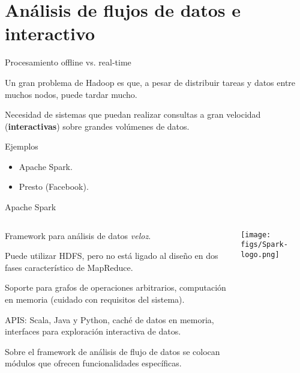 \section{Análisis de flujos de datos e interactivo}

\begin{frame}{Procesamiento offline vs. real-time}
 \begin{wideitemize}
  \item Un gran problema de Hadoop es que, a pesar de distribuir tareas y datos
  entre muchos nodos, puede tardar mucho.
  \item Necesidad de sistemas que puedan realizar consultas a gran velocidad
  (\textbf{interactivas}) sobre grandes volúmenes de datos.
  \item Ejemplos
  \begin{itemize}
   \item Apache Spark.
   \item Presto (Facebook).
  \end{itemize}

 \end{wideitemize}

\end{frame}


\begin{frame}{Apache Spark}
 \begin{columns}[T]
    \begin{column}{.8\textwidth}
     \begin{wideitemize}
      \item Framework para análisis de datos \textit{veloz}.
      \item Puede utilizar HDFS, pero no está ligado al diseño en dos fases 
      característico de MapReduce.
      \item Soporte para grafos de operaciones arbitrarios, computación en memoria
      (cuidado con requisitos del sistema).
      \item APIS: Scala, Java y Python, caché de datos en memoria, interfaces 
      para exploración interactiva de datos.
      \item Sobre el framework de análisis de flujo de datos se colocan módulos
      que ofrecen funcionalidades específicas.

    \end{wideitemize}
    \end{column}
    \begin{column}{.2\textwidth}
    \vspace*{.7cm}
    \texttt{[image: figs/Spark-logo.png]}
    \end{column}
  \end{columns}

\end{frame}

